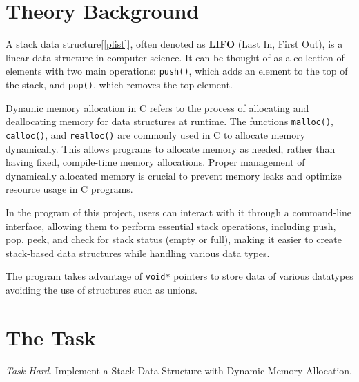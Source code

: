 \documentclass[12pt]{article}
\begin{document}
\setcounter{page}{2}
\pagestyle{fancy}
\fancyhf{}
\rhead{\thepage}

\section*{Theory Background}
A stack data structure[\ref{plist}], often denoted as \textbf{LIFO} (Last In, First Out), is a linear data structure in computer science. It can be thought of as a collection of elements with two main operations: \texttt{push()}, which adds an element to the top of the stack, and \texttt{pop()}, which removes the top element.

Dynamic memory allocation in C refers to the process of allocating and deallocating memory for data structures at runtime. The functions \texttt{malloc()}, \texttt{calloc()}, and \texttt{realloc()} are commonly used in C to allocate memory dynamically. This allows programs to allocate memory as needed, rather than having fixed, compile-time memory allocations. Proper management of dynamically allocated memory is crucial to prevent memory leaks and optimize resource usage in C programs.

In the program of this project, users can interact with it through a command-line interface, allowing them to perform essential stack operations, including push, pop, peek, and check for stack status (empty or full), making it easier to create stack-based data structures while handling various data types.

The program takes advantage of \texttt{void*} pointers to store data of various datatypes avoiding the use of structures such as unions.

\section*{The Task}
\emph{Task Hard}. Implement a Stack Data Structure with Dynamic Memory Allocation.
\end{document}
